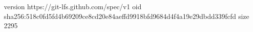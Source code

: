 version https://git-lfs.github.com/spec/v1
oid sha256:518c0fd5fd4b69209ce8cd20e84aeffd9918bfd9684d4f4a19e29dbdd339fcfd
size 2295
